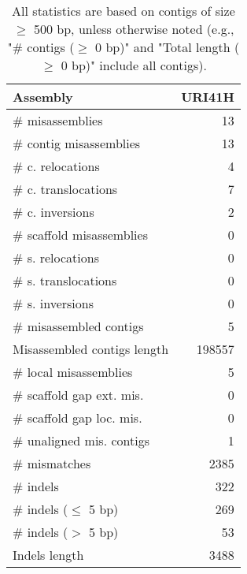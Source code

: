 \documentclass[12pt,a4paper]{article}
\begin{document}
\begin{table}[ht]
\begin{center}
\caption{All statistics are based on contigs of size $\geq$ 500 bp, unless otherwise noted (e.g., "\# contigs ($\geq$ 0 bp)" and "Total length ($\geq$ 0 bp)" include all contigs).}
\begin{tabular}{|l*{1}{|r}|}
\hline
Assembly & URI41H \\ \hline
\# misassemblies & 13 \\ \hline
\hspace{2mm}\# contig misassemblies & 13 \\ \hline
\hspace{5mm}\# c. relocations & 4 \\ \hline
\hspace{5mm}\# c. translocations & 7 \\ \hline
\hspace{5mm}\# c. inversions & 2 \\ \hline
\hspace{2mm}\# scaffold misassemblies & 0 \\ \hline
\hspace{5mm}\# s. relocations & 0 \\ \hline
\hspace{5mm}\# s. translocations & 0 \\ \hline
\hspace{5mm}\# s. inversions & 0 \\ \hline
\# misassembled contigs & 5 \\ \hline
Misassembled contigs length & 198557 \\ \hline
\# local misassemblies & 5 \\ \hline
\# scaffold gap ext. mis. & 0 \\ \hline
\# scaffold gap loc. mis. & 0 \\ \hline
\# unaligned mis. contigs & 1 \\ \hline
\# mismatches & 2385 \\ \hline
\# indels & 322 \\ \hline
\hspace{5mm}\# indels ($\leq$ 5 bp) & 269 \\ \hline
\hspace{5mm}\# indels ($>$ 5 bp) & 53 \\ \hline
Indels length & 3488 \\ \hline
\end{tabular}
\end{center}
\end{table}
\end{document}

